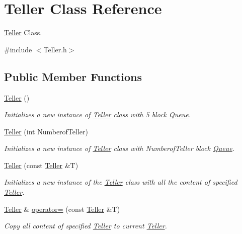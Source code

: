 \hypertarget{class_teller}{\section{Teller Class Reference}
\label{class_teller}
}


\hyperlink{class_teller}{Teller} Class.  




{\ttfamily \#include $<$Teller.\-h$>$}

\subsection*{Public Member Functions}
\begin{DoxyCompactItemize}
\item 
\hyperlink{class_teller_a652e56e65d8d73a53d709b8299e1c4a7}{Teller} ()
\begin{DoxyCompactList}\small\item\em Initializes a new instance of \hyperlink{class_teller}{Teller} class with 5 block \hyperlink{class_queue}{Queue}. \end{DoxyCompactList}\item 
\hyperlink{class_teller_a705ab8f9f4d16cba8f8ca9590d1598ca}{Teller} (int Numberof\-Teller)
\begin{DoxyCompactList}\small\item\em Initializes a new instance of \hyperlink{class_teller}{Teller} class with Numberof\-Teller block \hyperlink{class_queue}{Queue}. \end{DoxyCompactList}\item 
\hyperlink{class_teller_a96340cfc1acefbad9e329723dc08fabc}{Teller} (const \hyperlink{class_teller}{Teller} \&T)
\begin{DoxyCompactList}\small\item\em Initializes a new instance of the \hyperlink{class_teller}{Teller} class with all the content of specified \hyperlink{class_teller}{Teller}. \end{DoxyCompactList}\item 
\hyperlink{class_teller}{Teller} \& \hyperlink{class_teller_a8409f8ad1eb830534ad9d23d0ebacc57}{operator=} (const \hyperlink{class_teller}{Teller} \&T)
\begin{DoxyCompactList}\small\item\em Copy all content of specified \hyperlink{class_teller}{Teller} to current \hyperlink{class_teller}{Teller}. \end{DoxyCompactList}\item 

\end{DoxyCompactItemize}
